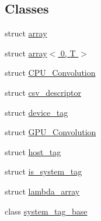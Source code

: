 \subsection*{Classes}
\begin{DoxyCompactItemize}
\item 
struct \hyperlink{structBC_1_1array}{array}
\item 
struct \hyperlink{structBC_1_1array_3_010_00_01T_01_4}{array$<$ 0, T $>$}
\item 
struct \hyperlink{structBC_1_1CPU__Convolution}{C\+P\+U\+\_\+\+Convolution}
\item 
struct \hyperlink{structBC_1_1csv__descriptor}{csv\+\_\+descriptor}
\item 
struct \hyperlink{structBC_1_1device__tag}{device\+\_\+tag}
\item 
struct \hyperlink{structBC_1_1GPU__Convolution}{G\+P\+U\+\_\+\+Convolution}
\item 
struct \hyperlink{structBC_1_1host__tag}{host\+\_\+tag}
\item 
struct \hyperlink{structBC_1_1is__system__tag}{is\+\_\+system\+\_\+tag}
\item 
struct \hyperlink{structBC_1_1lambda__array}{lambda\+\_\+array}
\item 
class \hyperlink{classBC_1_1system__tag__base}{system\+\_\+tag\+\_\+base}
\end{DoxyCompactItemize}
